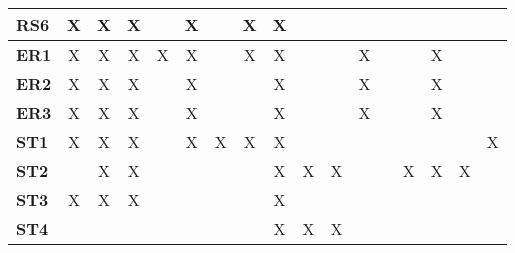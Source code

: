 \documentclass[12pt]{article}
\begin{document}
\begin{table}[H]
\begin{adjustwidth}{-0.1in}{-1in}
{\begin{tabular}{c|c|c|c|c|c|c|c|c|c|c|c|c|c|c|c|c|}
\multicolumn{1}{|l|}{\textbf{RS6}}   &      X       &      X       &       X      &              &       X      &              &       X      &       X      &              &              &              &              &              &              &              &               \\ \hline
\multicolumn{1}{|l|}{\textbf{ER1}}   &      X       &      X       &       X      &      X       &       X      &              &       X      &       X      &              &              &      X       &              &              &      X       &              &               \\ \hline
\multicolumn{1}{|l|}{\textbf{ER2}}   &      X       &      X       &       X      &              &       X      &              &              &       X      &              &              &      X       &              &              &      X       &              &               \\ \hline
\multicolumn{1}{|l|}{\textbf{ER3}}   &      X       &      X       &       X      &              &       X      &              &              &       X      &              &              &      X       &              &              &      X       &              &               \\ \hline
\multicolumn{1}{|l|}{\textbf{ST1}}   &      X       &      X       &       X      &              &       X      &      X       &       X      &       X      &              &              &              &              &              &              &              &       X       \\ \hline
\multicolumn{1}{|l|}{\textbf{ST2}}   &              &      X       &       X      &              &              &              &              &       X      &       X      &       X      &              &              &      X       &      X       &      X       &               \\ \hline
\multicolumn{1}{|l|}{\textbf{ST3}}   &      X       &      X       &       X      &              &              &              &              &       X      &              &              &              &              &              &              &              &               \\ \hline
\multicolumn{1}{|l|}{\textbf{ST4}}   &              &              &              &              &              &              &              &       X      &       X      &       X      &              &              &              &              &              &               \\ \hline

\end{tabular}}
\end{adjustwidth}
\end{table}
\end{document}
